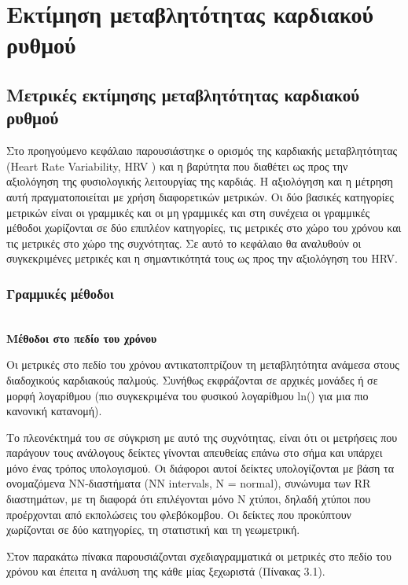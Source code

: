 
\gr
\chapter{Εκτίμηση μεταβλητότητας καρδιακού ρυθμού}
\section{Μετρικές εκτίμησης μεταβλητότητας καρδιακού ρυθμού}
Στο προηγούμενο κεφάλαιο παρουσιάστηκε ο ορισμός της καρδιακής μεταβλητότητας (\en Heart Rate Variability, HRV \gr) και η βαρύτητα που διαθέτει ως προς την αξιολόγηση της φυσιολογικής λειτουργίας της καρδιάς. Η αξιολόγηση και η μέτρηση αυτή πραγματοποιείται με χρήση διαφορετικών μετρικών. Οι δύο βασικές κατηγορίες μετρικών είναι οι γραμμικές και οι μη γραμμικές και στη συνέχεια οι γραμμικές μέθοδοι χωρίζονται σε δύο επιπλέον κατηγορίες, τις μετρικές στο χώρο του χρόνου και τις μετρικές στο χώρο της συχνότητας. Σε αυτό το κεφάλαιο θα αναλυθούν οι συγκεκριμένες μετρικές και η σημαντικότητά τους ως προς την αξιολόγηση του \en HRV. \gr
\subsection{Γραμμικές μέθοδοι}
\textbf{\\ Μέθοδοι στο πεδίο του χρόνου}
\par
Οι μετρικές στο πεδίο του χρόνου αντικατοπτρίζουν τη μεταβλητότητα ανάμεσα στους διαδοχικούς καρδιακούς παλμούς. Συνήθως εκφράζονται σε αρχικές μονάδες ή σε μορφή λογαρίθμου (πιο συγκεκριμένα του φυσικού λογαρίθμου \en ln() \gr για μια πιο κανονική κατανομή). 
\par
Το πλεονέκτημά του σε σύγκριση με αυτό της συχνότητας, είναι ότι οι μετρήσεις που παράγουν τους ανάλογους δείκτες γίνονται απευθείας επάνω στο σήμα και υπάρχει μόνο ένας τρόπος υπολογι\-σμού. Οι διάφοροι αυτοί δείκτες υπολογίζονται με βάση τα ονομαζόμενα ΝΝ-διαστήματα \en (NN intervals, N = normal), \gr  συνώνυμα των \en RR \gr διαστημάτων, με τη διαφορά ότι επιλέγονται μόνο Ν χτύποι, δηλαδή χτύποι που 
προέρχονται από εκπολώσεις του φλεβόκομβου. Οι δείκτες που προκύπτουν χωρίζονται σε δύο κατηγορίες, τη στατιστική και τη γεωμετρική.

\par
Στον παρακάτω πίνακα παρουσιάζονται σχεδιαγραμματικά οι μετρικές στο πεδίο του χρόνου και έπειτα η ανάλυση της κάθε μίας ξεχωριστά (Πίνακας 3.1).

